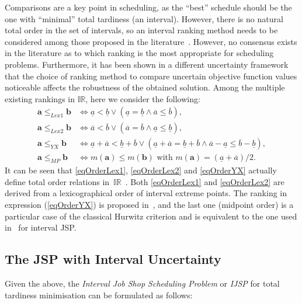 \documentclass[12pt,halfline,a4paper]{ouparticle}
\begin{document}
Comparisons are a key point in scheduling, as the ``best'' schedule should be the one with ``minimal'' total tardiness (an interval). However, there is no natural total order in the set of intervals, so an interval ranking method needs to be considered among those proposed in the literature~\cite{Karmakar2012}. However, no consensus exists in the literature as to which ranking is the most appropriate for scheduling problems. Furthermore, it has been shown in a different uncertainty framework~\cite{Palacios2015b} that the choice of ranking method to compare uncertain objective function values noticeable affects the robustness of the obtained solution. Among the multiple existing rankings in $\mathbb{IR}$, here we consider the following:
\begin{align}
\mathbf{a} \leq_{Lex1} \mathbf{b} & \Leftrightarrow \underline{a} < \underline{b} \vee (\underline{a} = \underline{b} \wedge \overline{a} \leq \overline{b}) \label{eqOrderLex1},\\
\mathbf{a} \leq_{Lex2} \mathbf{b} & \Leftrightarrow \overline{a} < \overline{b} \vee (\overline{a} = \overline{b} \wedge \underline{a} \leq \underline{b})\label{eqOrderLex2},\\
\mathbf{a} \leq_{YX} \mathbf{b} & \Leftrightarrow \underline{a}+\overline{a}<\underline{b}+\overline{b} \vee (\underline{a}+\overline{a}=\underline{b}+\overline{b} \wedge \overline{a}-\underline{a}\leq\overline{b}-\underline{b})\label{eqOrderYX},\\
\mathbf{a} \leq_{MP} \mathbf{b}& \Leftrightarrow m(\mathbf{a}) \leq m(\mathbf{b}) \mbox{ with } m(\mathbf{a}) =(\underline{a}+\overline{a})/2.\label{eqOrderMP}
\end{align}
It can be seen that \eqref{eqOrderLex1}, \eqref{eqOrderLex2} and \eqref{eqOrderYX} actually define total order relations in~$\mathbb{IR}$~\cite{Bustince2013}. Both \eqref{eqOrderLex1} and \eqref{eqOrderLex2} are derived from a lexicographical order of interval extreme points. The ranking in expression (\ref{eqOrderYX}) is proposed in~\cite{Xu2006}, and the last one (midpoint order) is a particular case of the classical Hurwitz criterion and is equivalent to the one used in~\cite{Lei2012c} for interval JSP. 

\subsection{The JSP with Interval Uncertainty}\label{subsecProblemFormulation}
Given the above, the \emph{Interval Job Shop Scheduling Problem} or \emph{IJSP} for total tardiness minimisation can be formulated as follows:
\end{document}
